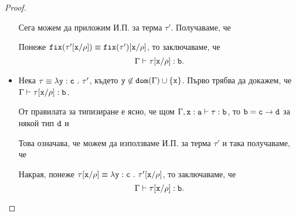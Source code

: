 \begin{proof}
\begin{itemize}
\begin{prooftree}
    \end{prooftree}
    Сега можем да приложим И.П. за терма $\tau'$. Получаваме, че
    \begin{prooftree}
    \end{prooftree}
    Понеже $\fix(\tau'\subst{x}{\rho}) \equiv \fix(\tau')\subst{x}{\rho}$, то заключаваме, че
    \[\Gamma \vdash \tau[\vv{x}/\rho] : \vv{b}.\]
  \item
    Нека $\tau \equiv \lamb{y}{c}{\tau'}$, където $\vv{y} \not\in \vv{dom}(\Gamma) \cup \{\vv{x}\}$.
    Първо трябва да докажем, че $\Gamma \vdash \tau[\vv{x}/\rho] : \vv{b}$.
    
    От правилата за типизиране е ясно, че щом $\Gamma, \type{x}{a} \vdash \tau : \vv{b}$, то
    $\vv{b} = \vv{c} \to \vv{d}$ за някой тип $\vv{d}$ и
    \begin{prooftree}
    \end{prooftree}
    Това означава, че можем да използваме И.П. за терма $\tau'$ и така получаваме, че
    \begin{prooftree}
    \end{prooftree}
    Накрая, понеже $\tau\subst{x}{\rho} \equiv \lamb{y}{c}{\tau'\subst{x}{\rho}}$, то
    заключаваме, че
    \[\Gamma \vdash \tau\subst{x}{\rho}:\vv{b}.\]


\end{itemize}
\end{proof}

